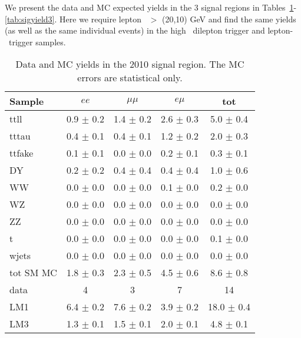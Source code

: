 We present the data and MC expected yields in the 3 signal regions in 
Tables~\ref{tab:sigyield1}-\ref{tab:sigyield3}.
Here we require lepton \pt\ $>$ (20,10) GeV and find
the same yields (as well as the same individual events) in the high \pt\ dilepton
trigger and lepton-\Ht\ trigger samples. 

\newpage

\begin{table}[hbt]
\begin{center}
\caption{\label{tab:sigyield1} Data and MC yields in the 2010 signal region. 
The MC errors are statistical only.}
\begin{tabular}{l|cccc}
\hline
         Sample   &           $ee$   &       $\mu\mu$   &         $e\mu$   &            tot  \\
\hline
           ttll   &  0.9 $\pm$ 0.2   &  1.4 $\pm$ 0.2   &  2.6 $\pm$ 0.3   &  5.0 $\pm$ 0.4  \\
          tttau   &  0.4 $\pm$ 0.1   &  0.4 $\pm$ 0.1   &  1.2 $\pm$ 0.2   &  2.0 $\pm$ 0.3  \\
         ttfake   &  0.1 $\pm$ 0.1   &  0.0 $\pm$ 0.0   &  0.2 $\pm$ 0.1   &  0.3 $\pm$ 0.1  \\
             DY   &  0.2 $\pm$ 0.2   &  0.4 $\pm$ 0.4   &  0.4 $\pm$ 0.4   &  1.0 $\pm$ 0.6  \\
             WW   &  0.0 $\pm$ 0.0   &  0.0 $\pm$ 0.0   &  0.1 $\pm$ 0.0   &  0.2 $\pm$ 0.0  \\
             WZ   &  0.0 $\pm$ 0.0   &  0.0 $\pm$ 0.0   &  0.0 $\pm$ 0.0   &  0.0 $\pm$ 0.0  \\
             ZZ   &  0.0 $\pm$ 0.0   &  0.0 $\pm$ 0.0   &  0.0 $\pm$ 0.0   &  0.0 $\pm$ 0.0  \\
              t   &  0.0 $\pm$ 0.0   &  0.0 $\pm$ 0.0   &  0.0 $\pm$ 0.0   &  0.1 $\pm$ 0.0  \\
          wjets   &  0.0 $\pm$ 0.0   &  0.0 $\pm$ 0.0   &  0.0 $\pm$ 0.0   &  0.0 $\pm$ 0.0  \\
\hline
      tot SM MC   &  1.8 $\pm$ 0.3   &  2.3 $\pm$ 0.5   &  4.5 $\pm$ 0.6   &  8.6 $\pm$ 0.8  \\
\hline
           data   &              4   &              3   &              7   &             14  \\
\hline
            LM1   &  6.4 $\pm$ 0.2   &  7.6 $\pm$ 0.2   &  3.9 $\pm$ 0.2   & 18.0 $\pm$ 0.4  \\
            LM3   &  1.3 $\pm$ 0.1   &  1.5 $\pm$ 0.1   &  2.0 $\pm$ 0.1   &  4.8 $\pm$ 0.1  \\
\hline
\end{tabular}
\end{center}
\end{table}


